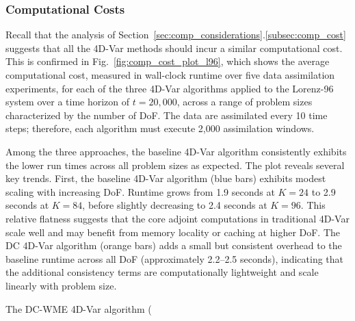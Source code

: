 \documentclass[final,1p,times]{elsarticle}
\begin{document}

\subsubsection{Computational Costs}

Recall that the analysis of Section~\ref{sec:comp_considerations}.\ref{subsec:comp_cost} suggests that all the 4D-Var methods should incur a similar computational cost. 
This is confirmed in Fig.~\ref{fig:comp_cost_plot_l96}, which shows the average computational cost, measured in wall-clock runtime over five data assimilation experiments, for each of the three 4D-Var algorithms applied to the Lorenz-96 system over a time horizon of $ t = 20{,}000 $, across a range of problem sizes characterized by the number of DoF. 
The data are assimilated every 10 time steps; therefore, each algorithm must execute 2,000 assimilation windows.

Among the three approaches, the baseline 4D-Var algorithm consistently exhibits the lower run times across all problem sizes as expected. The plot reveals several key trends.  First, the baseline 4D-Var algorithm (blue bars) exhibits modest scaling with increasing DoF. Runtime grows from 1.9 seconds at $K=24$ to 2.9 seconds at $K=84$, before slightly decreasing to 2.4 seconds at $K=96$. 
This relative flatness suggests that the core adjoint computations in traditional 4D-Var scale well and may benefit from memory locality or caching at higher DoF. The DC 4D-Var algorithm (orange bars) adds a small but consistent overhead to the baseline runtime across all DoF (approximately 2.2–2.5 seconds), indicating that the additional consistency terms are computationally lightweight and scale linearly with problem size. 

The DC-WME 4D-Var algorithm (
\end{document}
